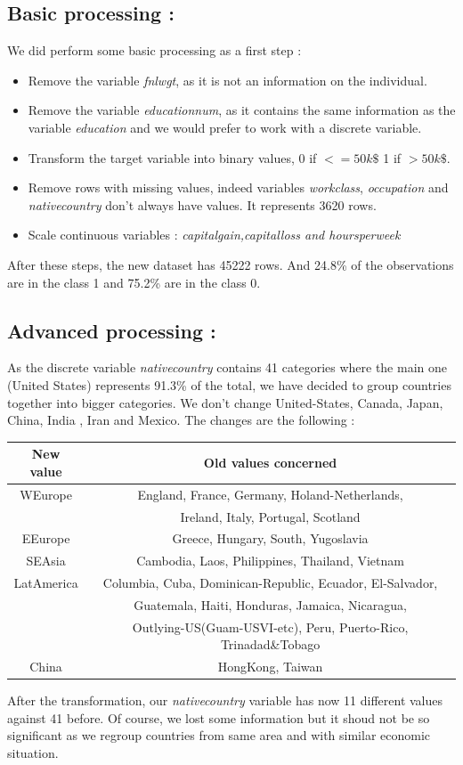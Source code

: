 \documentclass[11pt]{article}
\begin{document}
\subsection{Basic processing : }
We did perform some basic processing as a first step : 
\begin{itemize}
\item Remove the variable \emph{fnlwgt}, as it is not an information on the individual.
\item Remove the variable \emph{educationnum}, as it contains the same information as the variable \emph{education} and we would prefer to work with a discrete variable.
\item Transform the target variable into binary values,  0 if $<=50k\$$ 1 if $>50k\$$.
\item Remove rows with missing values, indeed variables \emph{workclass}, \emph{occupation} and \emph{nativecountry} don't always have values. It represents 3620 rows.
\item Scale continuous variables : \emph{capitalgain,capitalloss and hoursperweek}
\end{itemize}
After these steps, the new dataset has 45222 rows. And 24.8\% of the observations are in the class 1 and 75.2\% are in the class 0.
\subsection{Advanced processing :}
As the discrete variable \emph{nativecountry} contains 41 categories where the main one (United States) represents 91.3\% of the total, we have decided to group countries together into bigger categories. We don't change United-States, Canada, Japan, China, India , Iran and Mexico. The changes are the following :

\begin{center}

\begin{tabular}{|c|c|}
\hline
New value & Old values concerned \\
\hline
WEurope & England, France, Germany, Holand-Netherlands,\\
& Ireland, Italy, Portugal, Scotland\\
\hline
EEurope & Greece, Hungary, South, Yugoslavia\\
\hline
SEAsia & Cambodia, Laos, Philippines, Thailand, Vietnam\\
\hline
 LatAmerica & Columbia, Cuba, Dominican-Republic, Ecuador, El-Salvador, \\
&Guatemala, Haiti, Honduras, Jamaica, Nicaragua, \\
&Outlying-US(Guam-USVI-etc), Peru, Puerto-Rico, Trinadad\&Tobago \\
\hline
China & HongKong, Taiwan \\
\hline
\end{tabular}
\end{center}
After the transformation, our \emph{nativecountry} variable has now 11 different values against 41 before. Of course, we lost some information but it shoud not be so significant as we regroup countries from same area and with similar economic situation.
\end{document}
